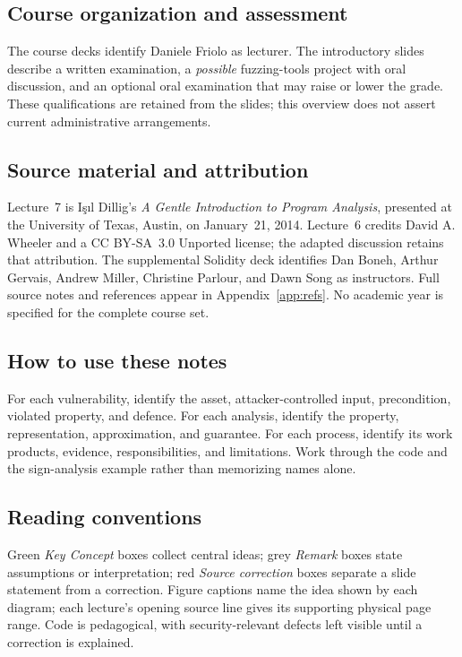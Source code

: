\documentclass[11pt,a4paper]{article}
\numberwithin{figure}{section}
\begin{document}
\subsection*{Course organization and assessment}
The course decks identify Daniele Friolo as lecturer. The introductory slides describe a written examination, a \emph{possible} fuzzing-tools project with oral discussion, and an optional oral examination that may raise or lower the grade. These qualifications are retained from the slides; this overview does not assert current administrative arrangements.

\subsection*{Source material and attribution}
Lecture~7 is I\c{s}\i l Dillig's \emph{A Gentle Introduction to Program Analysis}, presented at the University of Texas, Austin, on January~21, 2014. Lecture~6 credits David A. Wheeler and a CC BY-SA~3.0 Unported license; the adapted discussion retains that attribution. The supplemental Solidity deck identifies Dan Boneh, Arthur Gervais, Andrew Miller, Christine Parlour, and Dawn Song as instructors. Full source notes and references appear in Appendix~\ref{app:refs}. No academic year is specified for the complete course set.

\subsection*{How to use these notes}
For each vulnerability, identify the asset, attacker-controlled input, precondition, violated property, and defence. For each analysis, identify the property, representation, approximation, and guarantee. For each process, identify its work products, evidence, responsibilities, and limitations. Work through the code and the sign-analysis example rather than memorizing names alone.

\subsection*{Reading conventions}
Green \emph{Key Concept} boxes collect central ideas; grey \emph{Remark} boxes state assumptions or interpretation; red \emph{Source correction} boxes separate a slide statement from a correction. Figure captions name the idea shown by each diagram; each lecture's opening source line gives its supporting physical page range. Code is pedagogical, with security-relevant defects left visible until a correction is explained.
\end{document}
